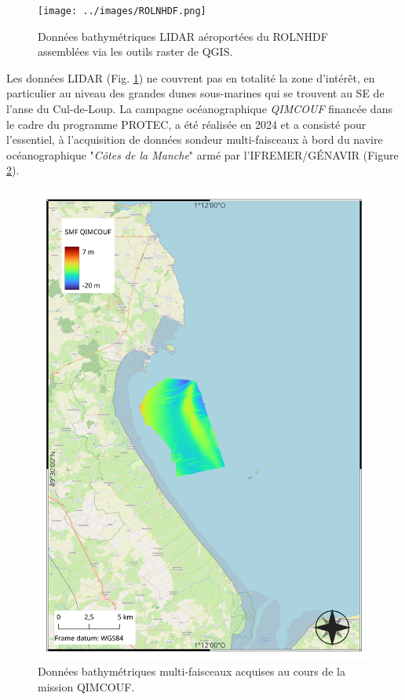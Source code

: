 \documentclass[10pt,a4paper,titlepage]{article}
\begin{document}
\begin{figure}[H]
    \centering
    \texttt{[image: ../images/ROLNHDF.png]}
    \caption{Données bathymétriques LIDAR aéroportées du ROLNHDF assemblées via les outils raster de QGIS.}
    \label{fig:ROLNHDF}
\end{figure}

Les données LIDAR (Fig. \ref{fig:ROLNHDF}) ne couvrent pas en totalité la zone d'intérêt, en particulier au niveau des grandes dunes sous-marines qui se trouvent au SE de l'anse du Cul-de-Loup. La campagne océanographique \textit{QIMCOUF} financée dans le cadre du programme PROTEC, a été réalisée en 2024 et a consisté pour l'essentiel, à l'acquisition de données sondeur multi-faisceaux à bord du navire océanographique "\textit{Côtes de la Manche}" armé par l'IFREMER/GÉNAVIR (Figure \ref{fig:QIMCOUF}).

\begin{figure}[H]
    \centering
    \includegraphics[scale=0.35]{../images/QIMCOUF.png}
    \caption{Données bathymétriques multi-faisceaux acquises au cours de la mission QIMCOUF.}
    \label{fig:QIMCOUF}
\end{figure}
\end{document}
